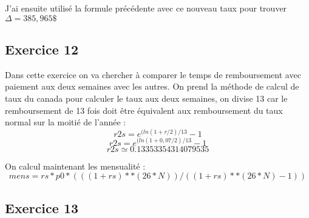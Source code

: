 \documentclass[12pt]{article}
\begin{document}
J'ai ensuite utilisé la formule précédente avec ce nouveau taux pour trouver $\Delta = 385,965\$ $

\subsection{Exercice 12 }

Dans cette exercice on va chercher à comparer le temps de remboursement avec paiement aux deux semaines avec les autres.
On prend la méthode de calcul de taux du canada pour calculer le taux aux deux semaines, on divise 13 car le remboursement de 13 fois doit être équivalent aux remboursement du taux normal sur la moitié de l'année :
\begin{equation}
r2s = e^{(ln(1+r/2)/13} -1
\end{equation}
\begin{equation}
r2s = e^{(ln(1+0,07 / 2)/13} -1
\end{equation}
\begin{equation}
r2s \simeq 0.13353354314079535
\end{equation}

On calcul maintenant les mensualité : 
\begin{equation}
mens = rs * p0 * ( ( (1+rs) ** (26*N) ) / ( (1+rs) ** (26*N) -1 ) ) 
\end{equation}

\subsection{Exercice 13 }
\end{document}
